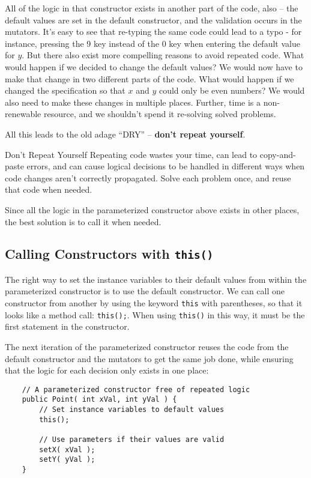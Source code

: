 All of the logic in that constructor exists in another part of the code, also -- the default values are set in the default constructor, and the validation occurs in the mutators.  It's easy to see that re-typing the same code could lead to a typo - for instance, pressing the 9 key instead of the 0 key when entering the default value for $y$.  But there also exist more compelling reasons to avoid repeated code.  What would happen if we decided to change the default values?  We would now have to make that change in two different parts of the code.  What would happen if we changed the specification so that $x$ and $y$ could only be even numbers?  We would also need to make these changes in multiple places.  Further, time is a non-renewable resource, and we shouldn't spend it re-solving solved problems.

All this leads to the old adage ``DRY'' -- \textbf{don't repeat yourself}.

\begin{tip}{Don't Repeat Yourself}
    Repeating code wastes your time, can lead to copy-and-paste errors, and can cause logical decisions to be handled in different ways when code changes aren't correctly propagated.  Solve each problem once, and reuse that code when needed.
\end{tip}

Since all the logic in the parameterized constructor above exists in other places, the best solution is to call it when needed.

\subsection{Calling Constructors with \texttt{this()}}

The right way to set the instance variables to their default values from within the parameterized constructor is to use the default constructor.  We can call one constructor from another by using the keyword \texttt{this} with parentheses, so that it looks like a method call: \texttt{this();}.  When using \texttt{this()} in this way, it must be the first statement in the constructor.

The next iteration of the parameterized constructor reuses the code from the default constructor and the mutators to get the same job done, while ensuring that the logic for each decision only exists in one place:

\begin{verbatim}
    // A parameterized constructor free of repeated logic
    public Point( int xVal, int yVal ) {
        // Set instance variables to default values
        this();

        // Use parameters if their values are valid
        setX( xVal );
        setY( yVal );
    }
\end{verbatim}

